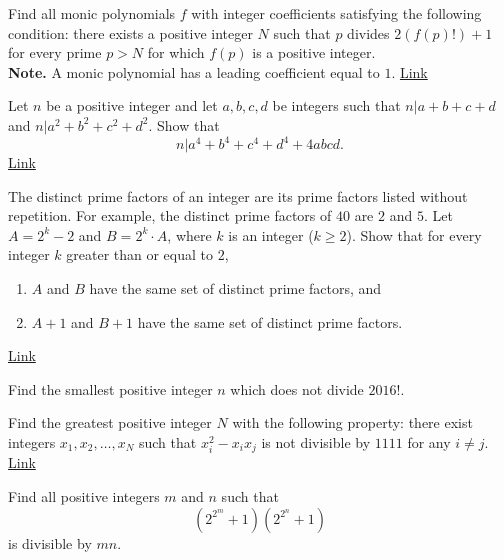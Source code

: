 \begin{problem}[Balkan]
	Find all monic polynomials $f$ with integer coefficients satisfying the following condition: there exists a positive integer $N$ such that $p$ divides $2(f(p)!)+1$ for every prime $p>N$ for which $f(p)$ is a positive integer.
	\\
	\textbf{Note.} A monic polynomial has a leading coefficient equal to $1$. \hfill \href{http://artofproblemsolving.com/community/c6h1239091p6316984}{Link}
\end{problem}


\begin{problem}
	Let $n$ be a positive integer and let $a, b, c, d$ be integers such that $n | a + b + c + d$ and $n | a^2 + b^2 + c^2 + d^2. $
	Show that \[n | a^4 + b^4 + c^4 + d^4 + 4abcd.\]
	\hfill \href{https://artofproblemsolving.com/community/c6h1334537p7212083}{Link}
\end{problem}

	
\begin{problem}
	The distinct prime factors of an integer are its prime factors listed without repetition. For example, the distinct prime factors of $40$ are $2$ and $5$. Let $A=2^k - 2$ and $B= 2^k \cdot A$, where $k$ is an integer ($k \geq 2$).
	Show that for every integer $k$ greater than or equal to $2$,
	\begin{enumerate}
		\item $A$ and $B$ have the same set of distinct prime factors, and
		\item $A+1$ and $B+1$ have the same set of distinct prime factors.
	\end{enumerate}
	\flushright \href{http://artofproblemsolving.com/community/c6h1203225p5926002}{Link}
\end{problem}



\begin{problem}
	Find the smallest positive integer $n$ which does not divide $2016!$.
\end{problem}




\begin{problem}[Benelux]
	Find the greatest positive integer $N$ with the following property: there exist integers $x_1, x_2, \ldots, x_N$ such that $x^2_i - x_ix_j$ is not divisible by $1111$ for any $i\ne j.$ \hfill \href{http://artofproblemsolving.com/community/c6h1236281p6284414}{Link}
\end{problem}



\begin{problem}
	Find all positive integers $m$ and $n$ such that \[\left(2^{2^m}+1\right)\left(2^{2^n}+1\right)\] is divisible by $mn$.
\end{problem}

